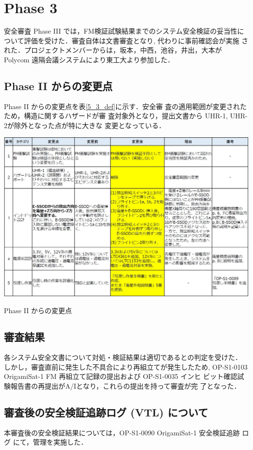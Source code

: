 \section{Phase 3}

安全審査 Phase III では，FM検証試験結果までのシステム安全検証の妥当性に
ついて評価を受けた．審査自体は文書審査となり, 代わりに事前確認会が実施
された．プロジェクトメンバーからは，坂本，中西，池谷，井出，大本が
Polycom 遠隔会議システムにより東工大より参加した．

\subsection{Phase II からの変更点}
Phase II からの変更点を表\ref{5_3_def}に示す．安全審
査の適用範囲が変更されたため，構造に関するハザードが審
査対象外となり，提出文書から UHR-1, UHR-2が除外となった点が特に大きな
変更となっている．

\begin{table}[htbp]
\centering
	\includegraphics[width=14cm]{./05/fig/5_3_def.jpg}
	\caption{Phase II からの変更点}
	\label{5_3_def}
\end{table}

\subsection{審査結果}
各システム安全文書について対処・検証結果は適切であるとの判定を受けた．
しかし，審査直前に発生した不具合により再組立てが発生したため,
OP-S1-0103 OrigamiSat-1 FM 再組立て記録の提出および OP-S1-0035 インヒ
ビット確認試験報告書の再提出がA/Iとなり，これらの提出を持って審査が完
了となった．

\subsection{審査後の安全検証追跡ログ (VTL) について}
本審査後の安全検証結果については，OP-S1-0090 OrigamiSat-1 安全検証追跡
ログ にて，管理を実施した．
